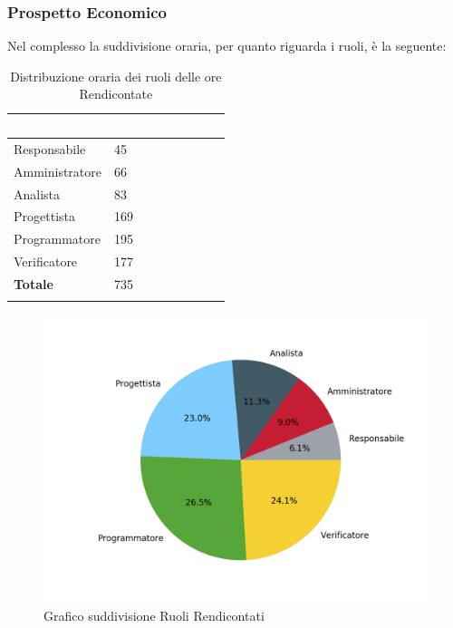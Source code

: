\newpage

\subsubsection{Prospetto Economico}
Nel complesso la suddivisione oraria, per quanto riguarda i ruoli, è la seguente:

\begin{longtable}{| C{.30\textwidth}| C{.15\textwidth}| C{.20\textwidth}|}
\hline
{}\textbf{\textcolor{white}{Ruolo}} & \textbf{\textcolor{white}{Ore}} & \textbf{\textcolor{white}{Costo in \euro}} \\
\hline \hline
\endhead
Responsabile & 45 &  \\
\hline
{}Amministratore & 66 &  \\
\hline
Analista & 83 &  \\
\hline
{}Progettista & 169 & \\
\hline 
Programmatore & 195 &  \\
\hline
{}Verificatore & 177 &  \\
\hline 
\textbf{Totale} & 735 & \\
\hline

\caption{Distribuzione oraria dei ruoli delle ore Rendicontate}
\label{Distribuzione oraria a carico del committente}
\end{longtable}

\begin{figure}[H]
	\centering
  		\includegraphics[width=1\linewidth]{./images/torta_to.png}
  		\caption{Grafico suddivisione Ruoli Rendicontati}
  		\label{fig:grafico suddivione ruoli}
\end{figure}


